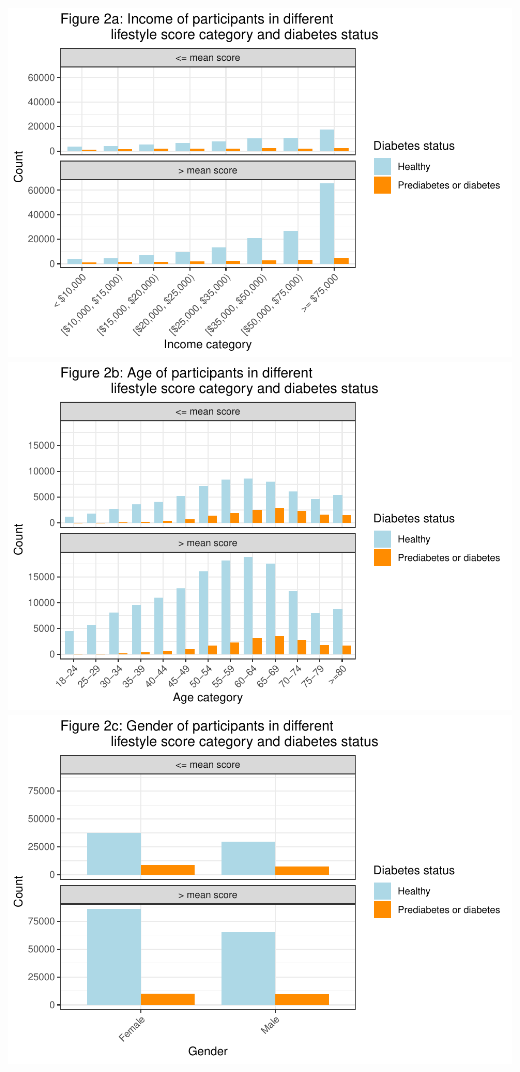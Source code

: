 \documentclass[
  12pt,
]{article}
\begin{document}
\includegraphics{template_files/figure-latex/unnamed-chunk-5-1.pdf}
\includegraphics{template_files/figure-latex/unnamed-chunk-5-2.pdf}
\includegraphics{template_files/figure-latex/unnamed-chunk-5-3.pdf}
\end{document}
